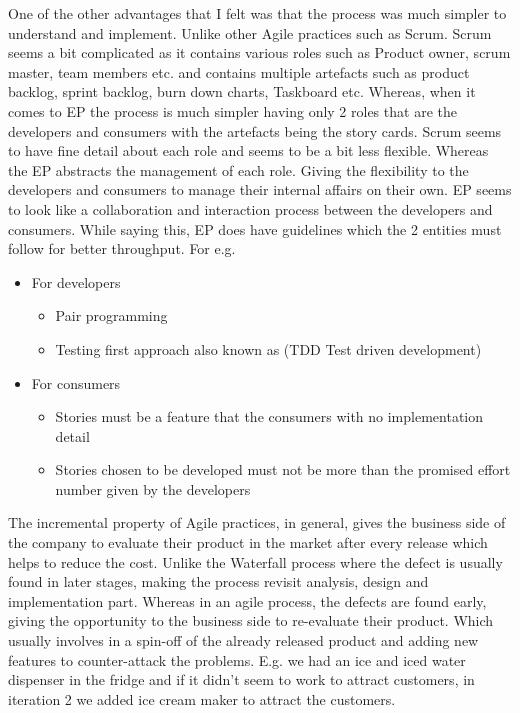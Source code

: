 One of the other advantages that I felt was that the process was much simpler to understand and implement. Unlike other Agile practices such as Scrum. Scrum seems a bit complicated as it contains various roles such as Product owner, scrum master, team members etc. and contains multiple artefacts such as product backlog, sprint backlog, burn down charts, Taskboard etc. Whereas, when it comes to EP the process is much simpler having only 2 roles that are the developers and consumers with the artefacts being the story cards. Scrum seems to have fine detail about each role and seems to be a bit less flexible. Whereas the EP abstracts the management of each role. Giving the flexibility to the developers and consumers to manage their internal affairs on their own. EP seems to look like a collaboration and interaction process between the developers and consumers. While saying this, EP does have guidelines which the 2 entities must follow for better throughput. For e.g.
\begin{itemize}
    \item For developers
          \begin{itemize}
              \item Pair programming
              \item Testing first approach also known as (TDD Test driven development)
          \end{itemize}
    \item For consumers
          \begin{itemize}
              \item Stories must be a feature that the consumers with no implementation detail
              \item Stories chosen to be developed must not be more than the promised effort number given by the developers
          \end{itemize}
\end{itemize}

The incremental property of Agile practices, in general, gives the business side of the company to evaluate their product in the market after every release which helps to reduce the cost. Unlike the Waterfall process where the defect is usually found in later stages, making the process revisit analysis, design and implementation part. Whereas in an agile process, the defects are found early, giving the opportunity to the business side to re-evaluate their product. Which usually involves in a spin-off of the already released product and adding new features to counter-attack the problems. E.g. we had an ice and iced water dispenser in the fridge and if it didn't seem to work to attract customers, in iteration 2 we added ice cream maker to attract the customers.

